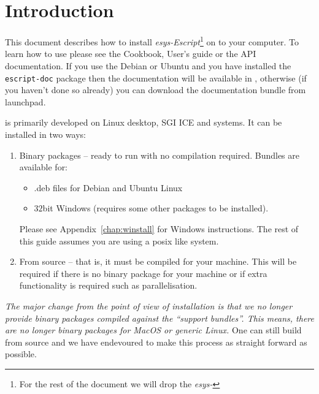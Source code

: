 %
%
%

\chapter{Introduction}
This document describes how to install \emph{esys-Escript}\footnote{For the rest of the document we will drop the \emph{esys-}} on to your computer.
To learn how to use \esfinley please see the Cookbook, User's guide or the API documentation.
If you use the Debian or Ubuntu and you have installed the \texttt{escript-doc} package then the documentation 
will be available in
, otherwise (if you haven't done so already) you can download the documentation bundle 
from launchpad.



\esfinley is primarily developed on Linux desktop, SGI ICE and \macosx systems.
It can be installed in two ways:
\begin{enumerate}
  \item Binary packages -- ready to run with no compilation required.
      Bundles are available for:
      \begin{itemize}
	  \item .deb files for Debian and Ubuntu Linux
	  \item $32$bit Windows (requires some other packages to be installed).
      \end{itemize}
    Please see Appendix~\ref{chap:winstall} for Windows instructions.
    The rest of this guide assumes you are using a posix like system.
  \item From source -- that is, it must be compiled for your machine.
  This will be required if there is no binary package 
    for your machine or if extra functionality is required such as \mpi parallelisation.
\end{enumerate}

\emph{The major change from the point of view of installation is that we no longer provide binary packages compiled
against the ``support bundles''.
This means, there are no longer binary packages for MacOS or generic Linux.
}
One can still build from source and we have endevoured to make this process as straight forward as possible.

